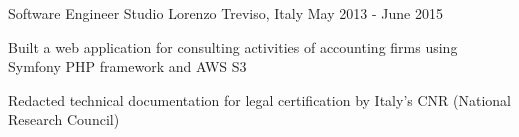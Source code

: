 \begin{cventries}
  \cventry
    {Software Engineer} %
    {Studio Lorenzo} %
    {Treviso, Italy} %
    {May 2013 - June 2015} %
    {
      \begin{cvitems} %
        \item {Built a web application for consulting activities of accounting firms using Symfony PHP framework and AWS S3}
        \item {Redacted technical documentation for legal certification by Italy's CNR (National Research Council)}
      \end{cvitems}
    }

\end{cventries}
